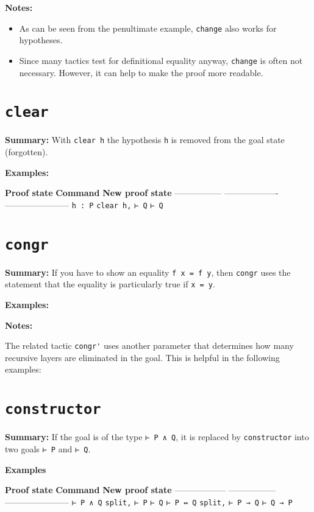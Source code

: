 \documentclass{memoir}
\begin{document}
\textbf{Notes:}

\begin{itemize}
\item As can be seen from the penultimate example, \Verb|change| also works for hypotheses.\item Since many tactics test for definitional equality anyway, \Verb|change| is often not necessary. However, it can help to make the proof more readable.

\end{itemize}




\section{\Verb|clear|}

\textbf{Summary:} With \Verb|clear h| the hypothesis \Verb|h| is removed from the goal state
(forgotten).

\textbf{Examples:}

\textbf{Proof state} \textbf{Command} \textbf{New proof state}
----------------- ------------------- -----------------------
\Verb|h : P| \Verb|clear h,| \Verb|⊢ Q|
\Verb|⊢ Q|




\section{\Verb|congr|}

\textbf{Summary:} If you have to show an equality \Verb|f x = f y|, then \Verb|congr| uses the statement that the equality is particularly true if \Verb|x = y|.

\textbf{Examples:}

\textbf{Notes:}

The related tactic \Verb|congr'| uses another parameter that determines how many recursive layers are eliminated in the goal. This is helpful in the following examples:




\section{\Verb|constructor|}

\textbf{Summary:} If the goal is of the type \Verb|⊢ P ∧ Q|, it is replaced by \Verb|constructor| into two goals \Verb|⊢ P| and \Verb|⊢ Q|.

\textbf{Examples}

\textbf{Proof state} \textbf{Command} \textbf{New proof state}
------------------ ----------------- -----------------------
\Verb|⊢ P ∧ Q| \Verb|split,| \Verb|⊢ P|
\Verb|⊢ Q|
\Verb|⊢ P ↔ Q| \Verb|split,| \Verb|⊢ P → Q|
\Verb|⊢ Q → P|
\end{document}
